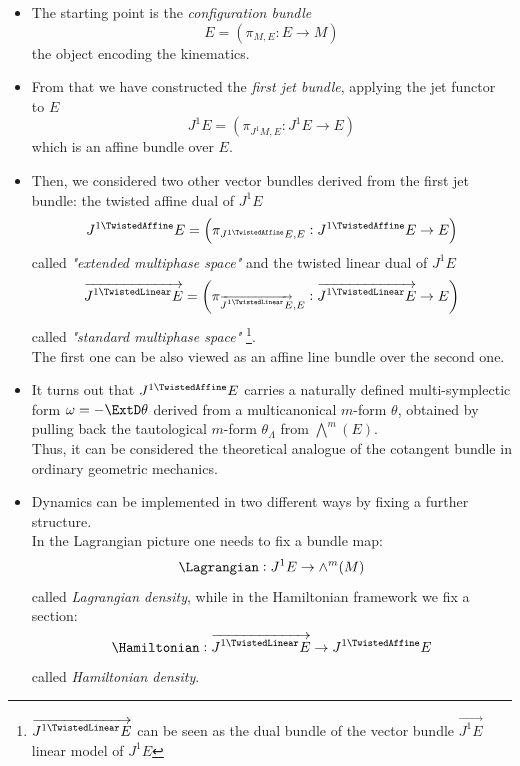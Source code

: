 \documentclass[a4paper,12pt,fleqn]{scrartcl}  %
\renewcommand{\AffDualJet}{ J^{1 \TwistedAffine}E }
\renewcommand{\LinDualJet}{ \overrightarrow{J^{1 \TwistedLinear}E} }
\begin{document}
\begin{itemize}
 \item The starting point is the \emph{configuration bundle} 
 	\begin{displaymath}
 		E = \left( \pi_{M,E} : E\rightarrow M \right)
 	\end{displaymath}
 	the object encoding the kinematics.
 \item From that we have constructed the \emph{first jet bundle}, applying the jet functor to $E$ 
 	\begin{displaymath}
 	J^1E = \left( \pi_{J^1 M,E} : J^1 E\rightarrow E \right)
 	\end{displaymath} 
 	which is an affine bundle over $E$.
 \item Then, we considered two other vector bundles derived from the first jet bundle: 
 	the twisted affine dual of $J^1E$ 
 	\begin{displaymath}
 	\AffDualJet  = \left( \pi_{ \AffDualJet ,E} : \AffDualJet  \rightarrow E \right)
 	\end{displaymath}
 	called \emph{"extended multiphase space"} and the twisted linear dual of $J^1 E$
	\begin{displaymath}
		\LinDualJet  = \left( \pi_{ \LinDualJet ,E} : \LinDualJet \rightarrow E \right)
	\end{displaymath}
	called \emph{"standard multiphase space"} \footnote{$\LinDualJet$ can be seen as the dual bundle of the vector bundle $\vec{J^1E}$ linear model of $J^1E$}.\\
	The first one can be also viewed as an affine line bundle over the second one.
	
\item It turns out that  $\AffDualJet $ carries a naturally defined multi-symplectic form $\omega = -\ExtD \theta$ derived from a multicanonical $m$-form $\theta$, obtained by pulling back the tautological $m$-form $\theta_\Lambda$ from $\bigwedge^m (E)$.\\
	Thus, it can be considered the theoretical analogue of the cotangent bundle in ordinary geometric mechanics.
	
\item Dynamics can be implemented in two different ways by fixing a further structure.\\
	In the Lagrangian picture one needs to fix a bundle map:
	\begin{displaymath}
		\Lagrangian : J^1 E \rightarrow \wedge^m (M)
	\end{displaymath}
	called \emph{Lagrangian density}, 	while in the Hamiltonian framework we fix a section:
	\begin{displaymath}
		\Hamiltonian : \LinDualJet \rightarrow \AffDualJet
	\end{displaymath}
	called \emph{Hamiltonian density}.


\end{itemize}
\end{document}
